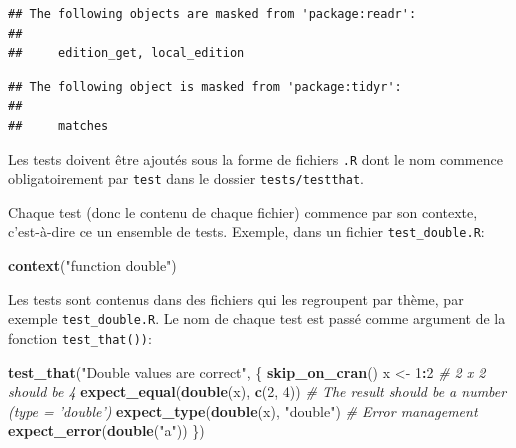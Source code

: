 \documentclass[
  12pt,
  french,
  a4paper,
  extrafontsizes,onecolumn,openright
  ]{memoir}
\newenvironment{Shaded}{\begin{snugshade}}{\end{snugshade}}
\newcommand{\CommentTok}[1]{\textcolor[rgb]{0.56,0.35,0.01}{\textit{#1}}}
\newcommand{\DecValTok}[1]{\textcolor[rgb]{0.00,0.00,0.81}{#1}}
\newcommand{\KeywordTok}[1]{\textcolor[rgb]{0.13,0.29,0.53}{\textbf{#1}}}
\newcommand{\NormalTok}[1]{#1}
\newcommand{\OperatorTok}[1]{\textcolor[rgb]{0.81,0.36,0.00}{\textbf{#1}}}
\newcommand{\StringTok}[1]{\textcolor[rgb]{0.31,0.60,0.02}{#1}}
\begin{document}
\begin{verbatim}
## The following objects are masked from 'package:readr':
## 
##     edition_get, local_edition
\end{verbatim}

\begin{verbatim}
## The following object is masked from 'package:tidyr':
## 
##     matches
\end{verbatim}

\normalsize

Les tests doivent être ajoutés sous la forme de fichiers \texttt{.R} dont le nom commence obligatoirement par \texttt{test} dans le dossier \texttt{tests/testthat}.

Chaque test (donc le contenu de chaque fichier) commence par son contexte, c'est-à-dire ce un ensemble de tests. Exemple, dans un fichier \texttt{test\_double.R}:

\scriptsize

\begin{Shaded}
\begin{Highlighting}[]
\KeywordTok{context}\NormalTok{(}\StringTok{"function double"}\NormalTok{)}
\end{Highlighting}
\end{Shaded}

\normalsize

Les tests sont contenus dans des fichiers qui les regroupent par thème, par exemple \texttt{test\_double.R}.
Le nom de chaque test est passé comme argument de la fonction \texttt{test\_that())}:

\scriptsize

\begin{Shaded}
\begin{Highlighting}[]
\KeywordTok{test_that}\NormalTok{(}\StringTok{"Double values are correct"}\NormalTok{, \{}
    \KeywordTok{skip_on_cran}\NormalTok{()}
\NormalTok{    x <-}\StringTok{ }\DecValTok{1}\OperatorTok{:}\DecValTok{2}
    \CommentTok{# 2 x 2 should be 4}
    \KeywordTok{expect_equal}\NormalTok{(}\KeywordTok{double}\NormalTok{(x), }\KeywordTok{c}\NormalTok{(}\DecValTok{2}\NormalTok{, }\DecValTok{4}\NormalTok{))}
    \CommentTok{# The result should be a number (type = 'double')}
    \KeywordTok{expect_type}\NormalTok{(}\KeywordTok{double}\NormalTok{(x), }\StringTok{"double"}\NormalTok{)}
    \CommentTok{# Error management}
    \KeywordTok{expect_error}\NormalTok{(}\KeywordTok{double}\NormalTok{(}\StringTok{"a"}\NormalTok{))}
\NormalTok{\})}
\end{Highlighting}
\end{Shaded}
\end{document}
